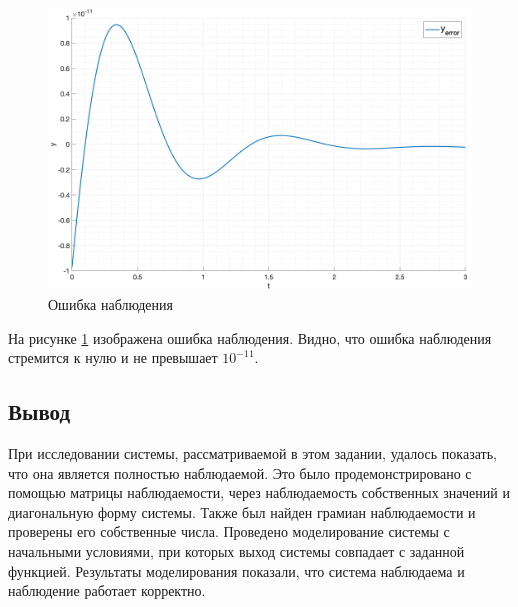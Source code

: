 \begin{figure}
    \centering
    \includegraphics[width=\textwidth]{media/plots/task3_error.png}
    \caption{Ошибка наблюдения}
    \label{fig:task3_estimation}
\end{figure}
На рисунке \ref{fig:task3_estimation} изображена ошибка наблюдения. Видно, что ошибка наблюдения стремится к нулю
и не превышает $10^{-11}$.

\FloatBarrier
\subsection{Вывод}
При исследовании системы, рассматриваемой в этом задании, удалось показать,
что она является полностью наблюдаемой. Это было продемонстрировано с помощью
матрицы наблюдаемости, через наблюдаемость собственных значений и диагональную
форму системы. Также был найден грамиан наблюдаемости и проверены его собственные
числа. Проведено моделирование системы с начальными условиями, при которых выход
системы совпадает с заданной функцией. Результаты моделирования показали, что
система наблюдаема и наблюдение работает корректно.